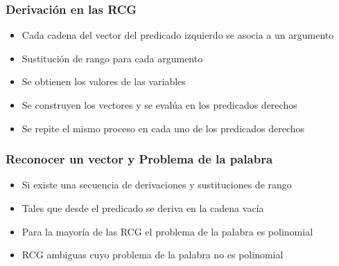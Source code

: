 \documentclass{beamer}
\begin{document}
\begin{frame}
    \frametitle{Derivación en las RCG}
    
    \begin{itemize}
        \item  Cada cadena del vector del predicado izquierdo se asocia a un argumento
              \pause
        \item Sustitución de rango para cada argumento
              \pause
        \item Se obtienen los valores de las variables
              \pause      
        \item Se construyen los vectores y se evalúa en los predicados derechos
              \pause      
        \item Se repite el mismo proceso en cada uno de los predicados derechos
    \end{itemize}
\end{frame}

\begin{frame}
    \frametitle{Reconocer un vector y Problema de la palabra}
    
    \begin{itemize}
        \item Si existe una secuencia de derivaciones y sustituciones de rango
              \pause
        \item Tales que desde el predicado se deriva en la cadena vacía
    \end{itemize}
    \vspace{1cm}
    \begin{itemize}
        \item Para la mayoría de las RCG el problema de la palabra es polinomial
              \pause
        \item RCG ambiguas cuyo problema de la palabra no es polinomial
    \end{itemize}
\end{frame}
\end{document}
